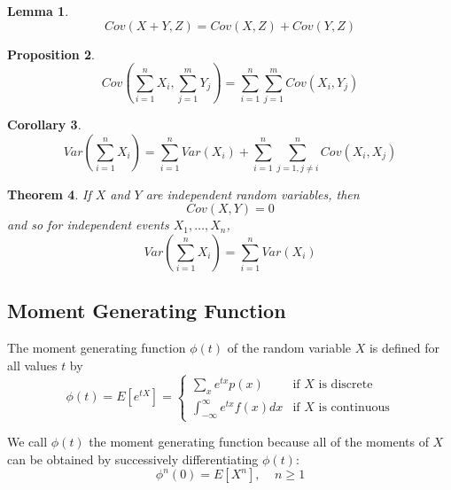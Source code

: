 \documentclass[12pt]{article}
\newtheorem{theorem}{Theorem}
\newtheorem{lemma}[theorem]{Lemma}
\newtheorem{corollary}[theorem]{Corollary}
\newtheorem{proposition}[theorem]{Proposition}
\begin{document}
\begin{lemma}
  \begin{equation*}
    Cov(X+Y,Z) = Cov(X,Z) + Cov(Y,Z)
  \end{equation*}
\end{lemma}

\begin{proposition}
  \begin{equation*}
    Cov \left( \sum_{i=1}^n X_i, \sum_{j=1}^m Y_j \right)
    = \sum_{i=1}^n \sum_{j=1}^m {Cov(X_i, Y_j)}
  \end{equation*}
\end{proposition}

\begin{corollary}
  \begin{equation*}
    Var(\sum_{i=1}^n X_i)
    = \sum_{i=1}^n {Var(X_i)} 
    + \sum_{i=1}^n \sum_{j = 1, j \neq i}^n {Cov(X_i, X_j)}
  \end{equation*}
\end{corollary}

\begin{theorem}
  If $X$ and $Y$ are independent random variables, then
  \begin{equation*}
    Cov(X,Y) = 0
  \end{equation*}
  and so for independent events $X_1,\dots,X_n$,
  \begin{equation*}
    Var(\sum_{i=1}^n X_i) = \sum_{i=1}^n {Var(X_i)}
  \end{equation*}
\end{theorem}

\subsection{Moment Generating Function}

The moment generating function $\phi(t)$ of the random variable $X$ is defined for all values $t$ by
\begin{equation*}
  \phi(t) = E[e^{tX}] =
  \begin{cases}
    \sum_x e^{tx} p(x) & \text{if $X$ is discrete} \\
    \int_{-\infty}^{\infty} e^{tx} f(x) dx & \text{if $X$ is continuous}
  \end{cases}
\end{equation*}

We call $\phi(t)$ the moment generating function because all of the moments of $X$ can be obtained by successively differentiating $\phi(t)$:
\begin{equation*}
  \phi^n(0) = E[X^n], \;\;\;\; n \ge 1
\end{equation*}
\end{document}
